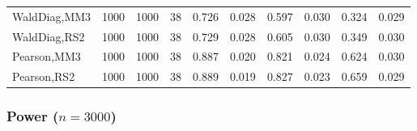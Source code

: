 \documentclass[
]{article}
\begin{document}
\begin{table}[H]
{\begin{tabular}[t]{lrrrrrrlrr}
\hspace{1em}WaldDiag,MM3 & 1000 & 1000 & 38 & 0.726 & 0.028 & 0.597 & 0.030 & 0.324 & 0.029\\
\hspace{1em}WaldDiag,RS2 & 1000 & 1000 & 38 & 0.729 & 0.028 & 0.605 & 0.030 & 0.349 & 0.030\\
\hspace{1em}Pearson,MM3 & 1000 & 1000 & 38 & 0.887 & 0.020 & 0.821 & 0.024 & 0.624 & 0.030\\
\hspace{1em}Pearson,RS2 & 1000 & 1000 & 38 & 0.889 & 0.019 & 0.827 & 0.023 & 0.659 & 0.029\\
\bottomrule
\end{tabular}}
\endgroup{}
\end{table}

\hypertarget{power-n3000-3}{%
\subsubsection{\texorpdfstring{Power
(\(n=3000\))}{Power (n=3000)}}\label{power-n3000-3}}
\end{document}
